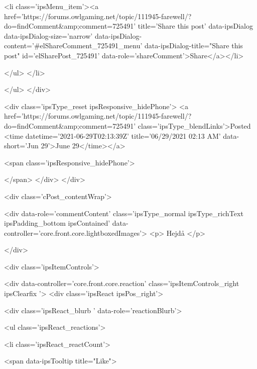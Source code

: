 						
							<li class='ipsMenu_item'><a href='https://forums.owlgaming.net/topic/111945-farewell/?do=findComment&amp;comment=725491' title='Share this post' data-ipsDialog data-ipsDialog-size='narrow' data-ipsDialog-content='#elShareComment_725491_menu' data-ipsDialog-title="Share this post" id='elSharePost_725491' data-role='shareComment'>Share</a></li>
						
                        
						
						
						
							
								
							
							
							
							
							
							
						
					</ul>
				</li>
				
			</ul>
		</div>

		<div class='ipsType_reset ipsResponsive_hidePhone'>
			<a href='https://forums.owlgaming.net/topic/111945-farewell/?do=findComment&amp;comment=725491' class='ipsType_blendLinks'>Posted <time datetime='2021-06-29T02:13:39Z' title='06/29/2021 02:13  AM' data-short='Jun 29'>June 29</time></a> 
			
			<span class='ipsResponsive_hidePhone'>
				
				
			</span>
		</div>
	</div>

	

    

	<div class='cPost_contentWrap'>
		
		<div data-role='commentContent' class='ipsType_normal ipsType_richText ipsPadding_bottom ipsContained' data-controller='core.front.core.lightboxedImages'>
			<p>
	Hejdå
</p>


			
		</div>

		
			<div class='ipsItemControls'>
				
					
						

	<div data-controller='core.front.core.reaction' class='ipsItemControls_right ipsClearfix '>	
		<div class='ipsReact ipsPos_right'>
			
				
				<div class='ipsReact_blurb ' data-role='reactionBlurb'>
					
						

	
	<ul class='ipsReact_reactions'>
		
		
			
				
				<li class='ipsReact_reactCount'>
					
						<span data-ipsTooltip title="Like">
					
